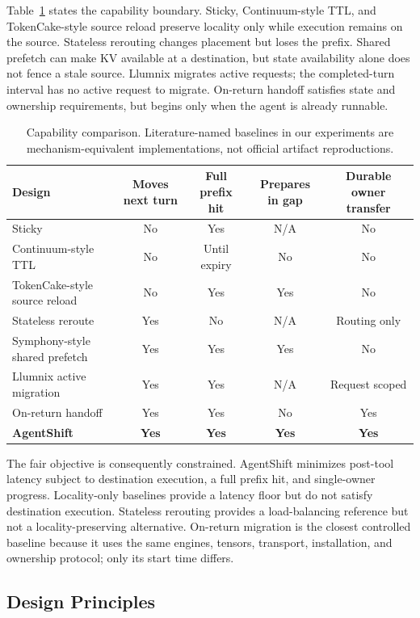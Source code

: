 Table~\ref{tab:capabilities} states the capability boundary. Sticky, Continuum-style TTL, and TokenCake-style source reload preserve locality only while execution remains on the source. Stateless rerouting changes placement but loses the prefix. Shared prefetch can make KV available at a destination, but state availability alone does not fence a stale source. Llumnix migrates active requests; the completed-turn interval has no active request to migrate. On-return handoff satisfies state and ownership requirements, but begins only when the agent is already runnable.

\begin{table}[t]
\centering
\small
\caption{Capability comparison. Literature-named baselines in our experiments are mechanism-equivalent implementations, not official artifact reproductions.}
\label{tab:capabilities}
\begin{tabular}{lcccc}
\toprule
Design & Moves next turn & Full prefix hit & Prepares in gap & Durable owner transfer \\
\midrule
Sticky & No & Yes & N/A & No \\
Continuum-style TTL & No & Until expiry & No & No \\
TokenCake-style source reload & No & Yes & Yes & No \\
Stateless reroute & Yes & No & N/A & Routing only \\
Symphony-style shared prefetch & Yes & Yes & Yes & No \\
Llumnix active migration & Yes & Yes & N/A & Request scoped \\
On-return handoff & Yes & Yes & No & Yes \\
\textbf{AgentShift} & \textbf{Yes} & \textbf{Yes} & \textbf{Yes} & \textbf{Yes} \\
\bottomrule
\end{tabular}
\end{table}

The fair objective is consequently constrained. AgentShift minimizes post-tool latency subject to destination execution, a full prefix hit, and single-owner progress. Locality-only baselines provide a latency floor but do not satisfy destination execution. Stateless rerouting provides a load-balancing reference but not a locality-preserving alternative. On-return migration is the closest controlled baseline because it uses the same engines, tensors, transport, installation, and ownership protocol; only its start time differs.

\subsection{Design Principles}\label{design-principles}

